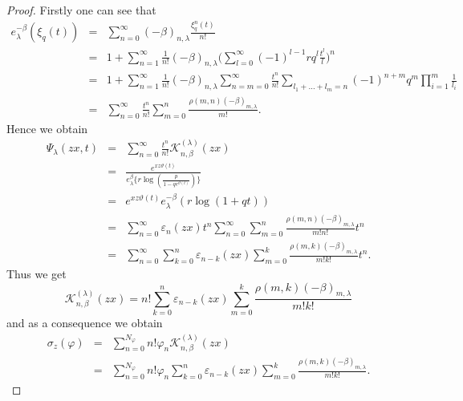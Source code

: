 \documentclass{birkjour}
\theoremstyle{definition}
\theoremstyle{remark}
\numberwithin{equation}{section}
\begin{document}
\begin{proof}
Firstly one can see that
$$\begin{array}{lll}
e^{-\beta}_{\lambda}(\xi_{q}(t))&=&\displaystyle{\sum^{\infty}_{n=0}(-\beta)_{n,
\lambda}\frac{\xi^{n}_{q}(t)}{n!}}\\
&=&\displaystyle{1+\sum^{\infty}_{n=1}\frac{1}{n!}(-\beta)_{n,
\lambda}\Big(\sum^{\infty}_{l=0}(-1)^{l-1}rq^{l}\frac{t^{l}}{l}\Big)^{n}}\\
&=&\displaystyle{1+\sum^{\infty}_{n=1}\frac{1}{n!}(-\beta)_{n,
\lambda}\sum^{\infty}_{n=m=0}\frac{t^{n}}{n!}\sum_{l_{1}+\ldots+l_{m}=n}(-1)^{n+m}q^{m}\prod^{m}_{i=1}\frac{1}{l_{i}}}\\
&=&\displaystyle{\sum^{\infty}_{n=0}\frac{t^{n}}{n!}\sum^{n}_{m=0}\frac{\rho(m,
n)(-\beta)_{m, \lambda}}{m!}}.
\end{array}
$$
Hence we obtain
$$\begin{array}{lll}
\Psi_{\lambda}(zx,
t)&=&\displaystyle{\sum^{\infty}_{n=0}\frac{t^{n}}{n!}\mathcal{K}^{(\lambda)}_{n,
\beta}(zx)}\\
&=&\displaystyle{\frac{e^{xz\vartheta(t)}}{e^{\beta}_{\lambda}\{r\log(\frac{p}{1-qe^{\vartheta(t)}})\}}}\\
&=&e^{xz\vartheta(t)}e^{-\beta}_{\lambda}(r\log(1+qt))\\
&=&\displaystyle{\sum^{\infty}_{n=0}\varepsilon_{n}(zx)t^{n}\sum^{\infty}_{n=0}\sum^{n}_{m=0}\frac{\rho(m,
n)(-\beta)_{m, \lambda}}{m!n!}t^{n}}\\
&=&\displaystyle{\sum^{\infty}_{n=0}\sum^{n}_{k=0}\varepsilon_{n-k}(zx)\sum^{k}_{m=0}\frac{\rho(m,
k)(-\beta)_{m, \lambda}}{m!k!}t^{n}}.
\end{array}$$
Thus we get
$$\mathcal{K}^{(\lambda)}_{n,
\beta}(zx)=\displaystyle{n!\sum^{n}_{k=0}\varepsilon_{n-k}(zx)\sum^{k}_{m=0}\frac{\rho(m,
k)(-\beta)_{m, \lambda}}{m!k!}}$$ and as a consequence we obtain
$$\begin{array}{lll}
\sigma_{z}(\varphi)&=&\displaystyle{\sum^{N_{\varphi}}_{n=0}n!\varphi_{n}\mathcal{K}^{(\lambda)}_{n,
\beta}(zx)}\\
&=&\displaystyle{\sum^{N_{\varphi}}_{n=0}n!\varphi_{n}\sum^{n}_{k=0}\varepsilon_{n-k}(zx)\sum^{k}_{m=0}\frac{\rho(m,
k)(-\beta)_{m, \lambda}}{m!k!}}.
\end{array}$$
\end{proof}
\end{document}
